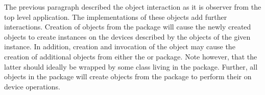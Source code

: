 \documentclass[twoside,a4paper]{article}
\begin{document}
The previous paragraph described the object interaction as it is observer from the top level application.
The implementations of these objects add further interactions.
Creation of objects from the  package will cause the newly created objects to create  instances on the devices described by the  objects of the given  instance.
In addition, creation and invocation of the  object may cause the creation of additional objects from either the  or  package.
Note however, that the latter should ideally be wrapped by some class living in the  package.
Further, all objects in the  package will create objects from the  package to perform their on device operations.

\listoftodos
\end{document}
